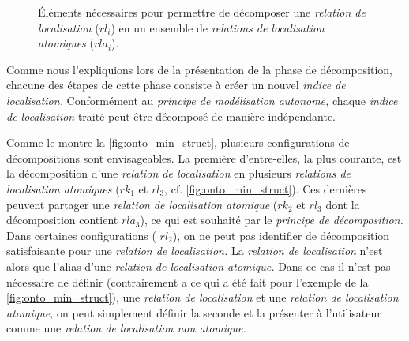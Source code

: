 \begin{figure}
  \centering
   
  \caption{Éléments nécessaires pour permettre de décomposer une
    \emph{relation de localisation} ($rl_i$) en un ensemble de
    \emph{relations de localisation atomiques} ($rla_i$).}
  \label{fig:onto_min_struct}
\end{figure}

Comme nous l'expliquions lors de la présentation de la phase de
décomposition, chacune des étapes de cette phase consiste à créer un
nouvel \emph{indice de localisation.} Conformément au \emph{principe
  de modélisation autonome,} chaque \emph{indice de localisation}
traité peut être décomposé de manière indépendante.

Comme le montre la \autoref{fig:onto_min_struct}, plusieurs
configurations de décompositions sont envisageables. La première
d'entre-elles, la plus courante, est la décomposition d'une
\emph{relation de localisation} en plusieurs \emph{relations de
  localisation atomiques} (\eg \(rk_1\) et \(rl_3\),
cf. \autoref{fig:onto_min_struct}). Ces dernières peuvent partager une
\emph{relation de localisation atomique} (\eg \(rk_2\) et \(rl_3\)
dont la décomposition contient \(rla_3\)), ce qui est souhaité par le
\emph{principe de décomposition.} Dans certaines configurations (\eg
\(rl_2\)), on ne peut pas identifier de décomposition satisfaisante
pour une \emph{relation de localisation.} La \emph{relation de
  localisation} n'est alors que l'alias d'une \emph{relation de
  localisation atomique.} Dans ce cas il n'est pas nécessaire de
définir (contrairement a ce qui a été fait pour l'exemple de la
\autoref{fig:onto_min_struct}), une \emph{relation de localisation} et
une \emph{relation de localisation atomique,} on peut simplement
définir la seconde et la présenter à l'utilisateur comme une
\emph{relation de localisation non atomique.}


